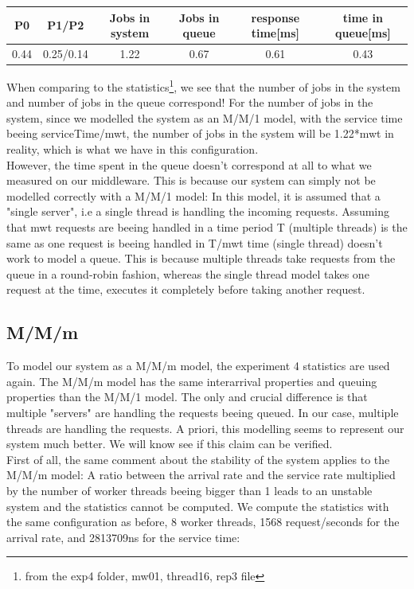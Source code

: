 \documentclass[11pt,a4paper]{article}
\begin{document}
\begin{center}

		\begin{tabular}{|c|c|c|c|c|c|}
			  \hline
			  \textbf{P0} & \textbf{P1/P2} & \textbf{Jobs in system} & \textbf{Jobs in queue} & \textbf{response time[ms]} & \textbf{time in queue[ms]}\\
			  \hline
			  0.44 & 0.25/0.14 & 1.22 & 0.67 & 0.61 & 0.43 \\
			  \hline
		\end{tabular}
 
\end{center}
\newpage
 When comparing to the statistics\footnote{from the exp4 folder, mw01, thread16, rep3 file}, we see that the number of jobs in the system and number of jobs in the queue correspond! For the number of jobs in the system, since we modelled the system as an M/M/1 model, with the service time beeing serviceTime/mwt, the number of jobs in the system will be 1.22*mwt in reality, which is what we have in this configuration. 
 \\
However, the time spent in the queue doesn't correspond at all to what we measured on our middleware. This is because our system can simply not be modelled correctly with a M/M/1 model: In this model, it is assumed that a "single server", i.e a single thread is handling the incoming requests. Assuming that mwt requests are beeing handled in a time period T (multiple threads) is the same as one request is beeing handled in T/mwt time (single thread) doesn't work to model a queue. This is because multiple threads take requests from the queue in a round-robin fashion, whereas the single thread model takes one request at the time, executes it completely before taking another request. 

  
\subsection{M/M/m}

To model our system as a M/M/m model, the experiment 4 statistics are used again.
The M/M/m model has the same interarrival properties and queuing properties than the M/M/1 model. The only and crucial difference is that multiple "servers" are handling the requests beeing queued. In our case, multiple threads are handling the requests. A priori, this modelling seems to represent our system much better. We will know see if this claim can be verified. 
\\
First of all, the same comment about the stability of the system applies to the M/M/m model: A ratio between the arrival rate and the service rate multiplied by the number of worker threads beeing bigger than 1 leads to an unstable system and the statistics cannot be computed. We compute the statistics with the same configuration as before, 8 worker threads, 1568 request/seconds for the arrival rate, and 2813709ns for the service time:
\end{document}
